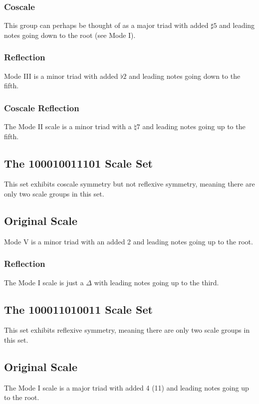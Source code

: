 \documentclass[english]{./gbook}
\begin{document}
\begin{large}
\subsubsection*{Coscale}
This group can perhaps be thought of as a major triad with added $\sharp5$ and leading notes going down to the root (see Mode I).
\subsubsection*{Reflection}
Mode III is a minor triad with added $\flat2$ and leading notes going down to the fifth.
\subsubsection*{Coscale Reflection}
The Mode II scale is a minor triad with a $\natural7$ and leading notes going up to the fifth.

\subsection{The 100010011101 Scale Set}
This set exhibits coscale  symmetry but not reflexive symmetry, meaning there are only two scale groups in this set.
\subsection*{Original Scale}
Mode V is a minor triad with an added 2 and leading notes going up to the root.
\subsubsection*{Reflection}
The Mode I scale is just a $\Delta$ with leading notes going up to the third.

\subsection{The 100011010011 Scale Set}
This set exhibits reflexive symmetry, meaning there are only two scale groups in this set.
\subsection*{Original Scale}
The Mode I scale is a major triad with added 4 (11) and leading notes going up to the root.

\end{large}
\end{document}
